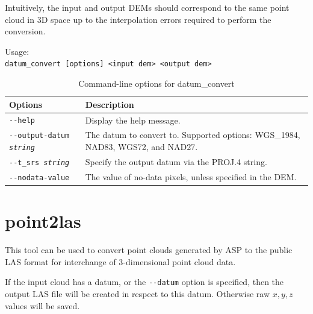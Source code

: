 Intuitively, the input and output DEMs should correspond to the same
point cloud in 3D space up to the interpolation errors required to
perform the conversion.

\medskip
Usage:\\
\hspace*{2em}\texttt{datum\_convert [options] <input dem> <output dem>}
\medskip

\begin{longtable}{|l|p{10cm}|}
\caption{Command-line options for datum\_convert}
\label{tbl:datumconvert}
\endfirsthead
\endhead
\endfoot
\endlastfoot
\hline
Options & Description \\ \hline \hline
\texttt{-\/-help} & Display the help message.\\ \hline
\texttt{-\/-output-datum \textit{string}} & The datum to convert to. Supported options: WGS\_1984, NAD83, WGS72, and NAD27. \\ \hline
\texttt{-\/-t\_srs \textit{string}} & Specify the output datum via the PROJ.4 string. \\ \hline
\texttt{-\/-nodata-value} & The value of no-data pixels, unless specified in the DEM.\\ \hline
\end{longtable}


\section{point2las}
\label{point2las}

This tool can be used to convert point clouds generated by ASP to the
public LAS format for interchange of 3-dimensional point cloud data.

If the input cloud has a datum, or the \texttt{-\/-datum} option is specified,
then the output LAS file will be created in respect to this datum. Otherwise
raw $x,y,z$ values will be saved.

